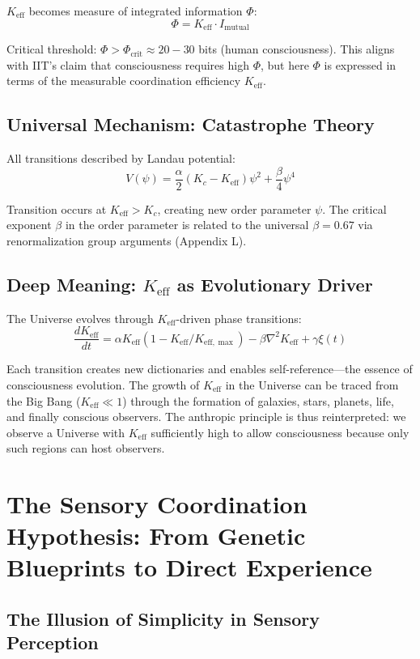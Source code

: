 \documentclass[12pt,a4paper]{article}
\newcommand{\eff}{\mathrm{eff}}
\newcommand{\Ke}{K_{\eff}}
\newcommand{\Kemax}{K_{\eff,\max}}
\begin{document}
	$\Ke$ becomes measure of integrated information $\Phi$:
	\[
	\Phi = \Ke \cdot I_{\text{mutual}}
	\]
	
	Critical threshold: $\Phi > \Phi_{\text{crit}} \approx 20-30$ bits (human consciousness). This aligns with IIT's claim that consciousness requires high $\Phi$, but here $\Phi$ is expressed in terms of the measurable coordination efficiency $\Ke$.
	
	\subsection{Universal Mechanism: Catastrophe Theory}
	
	All transitions described by Landau potential:
	\[
	V(\psi) = \frac{\alpha}{2}(K_c - \Ke)\psi^2 + \frac{\beta}{4}\psi^4
	\]
	
	Transition occurs at $\Ke > K_c$, creating new order parameter $\psi$. The critical exponent $\beta$ in the order parameter is related to the universal $\beta = 0.67$ via renormalization group arguments (Appendix L).
	
	\subsection{Deep Meaning: $\Ke$ as Evolutionary Driver}
	
	The Universe evolves through $\Ke$-driven phase transitions:
	\[
	\frac{d\Ke}{dt} = \alpha \Ke(1 - \Ke/\Kemax) - \beta \nabla^2 \Ke + \gamma \xi(t)
	\]
	
	Each transition creates new dictionaries and enables self-reference—the essence of consciousness evolution. The growth of $\Ke$ in the Universe can be traced from the Big Bang ($\Ke \ll 1$) through the formation of galaxies, stars, planets, life, and finally conscious observers. The anthropic principle is thus reinterpreted: we observe a Universe with $\Ke$ sufficiently high to allow consciousness because only such regions can host observers.
	
	\section{The Sensory Coordination Hypothesis: From Genetic Blueprints to Direct Experience}
	
	\subsection{The Illusion of Simplicity in Sensory Perception}
	
\end{document}
